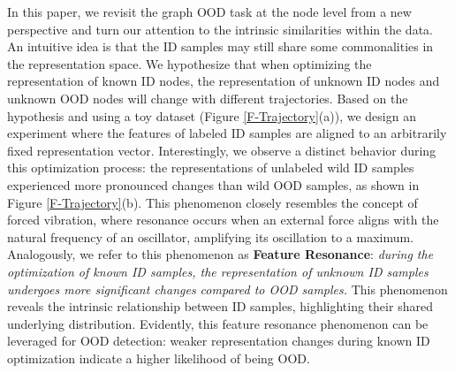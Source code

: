 In this paper, we revisit the graph OOD task at the node level from a new perspective and turn our attention to the intrinsic similarities within the data. An intuitive idea is that the ID samples may still share some commonalities in the representation space. We hypothesize that when optimizing the representation of known ID nodes, the representation of unknown ID nodes and unknown OOD nodes will change with different trajectories.
Based on the hypothesis and using a toy dataset (Figure \ref{F-Trajectory}(a)), we design an experiment where the features of labeled ID samples are aligned to an arbitrarily fixed representation vector. Interestingly, we observe a distinct behavior during this optimization process: the representations of unlabeled wild ID samples experienced more pronounced changes than wild OOD samples, as shown in Figure \ref{F-Trajectory}(b). This phenomenon closely resembles the concept of forced vibration, where resonance occurs when an external force aligns with the natural frequency of an oscillator, amplifying its oscillation to a maximum. Analogously, we refer to this phenomenon as \textbf{Feature Resonance}: \textit{during the optimization of known ID samples, the representation of unknown ID samples undergoes more significant changes compared to OOD samples.} 
This phenomenon reveals the intrinsic relationship between ID samples, highlighting their shared underlying distribution. Evidently, this feature resonance phenomenon can be leveraged for OOD detection: weaker representation changes during known ID optimization indicate a higher likelihood of being OOD.


